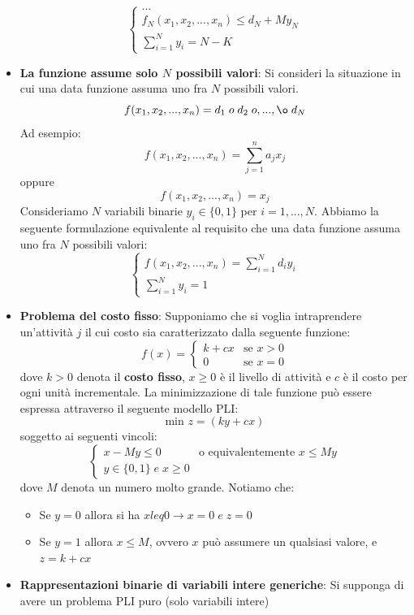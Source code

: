 \documentclass[12pt]{article}
\begin{document}
\begin{itemize}
$$\begin{cases}
        ... \\
        f_N(x_1, x_2, ..., x_n) \leq d_N + My_N \\
        \sum_{i=1}^{N} y_i = N - K
    \end{cases}$$
    \item \textbf{La funzione assume solo $N$ possibili valori}: Si consideri la situazione in cui una data funzione assuma uno fra $N$ possibili valori.
    $$f(x_1, x_2, ..., x_n) = d_1 \; o \; d_2 \; o ,..., \o \; d_N$$
    Ad esempio:
    $$f(x_1, x_2, ..., x_n) = \sum_{j=1}^{n} a_jx_j$$
    oppure
    $$f(x_1, x_2, ..., x_n) = x_j$$
    Consideriamo $N$ variabili binarie $y_i \in \{0,1\}$ per $i = 1,...,N$.
    Abbiamo la seguente formulazione equivalente al requisito che una data funzione assuma uno fra $N$ possibili valori:
    $$\begin{cases}
        f(x_1, x_2, ..., x_n) = \sum_{i=1}^{N} d_i y_i \\
        \sum_{i=1}^{N} y_i = 1
    \end{cases}$$
    \item \textbf{Problema del costo fisso}: Supponiamo che si voglia intraprendere un'attività $j$ il cui costo sia caratterizzato dalla seguente funzione:
    $$f(x) = \begin{cases}
        k + cx & \textrm{se } x > 0 \\
        0 & \textrm{se } x = 0
    \end{cases}$$
    dove $k > 0$ denota il \textbf{costo fisso}, $x \geq 0$ è il livello di attività e $c$ è il costo per ogni unità incrementale.
    La minimizzazione di tale funzione può essere espressa attraverso il seguente modello PLI:
    $$\textrm{min } z = (ky + cx)$$
    soggetto ai seguenti vincoli:
    $$\begin{cases}
        x - My \leq 0 & \textrm{o equivalentemente } x \leq My \\
        y \in \{0,1\} \; e \; x \geq 0
    \end{cases}$$
    dove $M$ denota un numero molto grande. Notiamo che:
    \begin{itemize}
        \item Se $y = 0$ allora si ha $x leq 0 \rightarrow x = 0 \; e \; z = 0$
        \item Se $y = 1$ allora $x \leq M$, ovvero $x$ può assumere un qualsiasi valore, e $z = k + cx$
    \end{itemize}
    \item \textbf{Rappresentazioni binarie di variabili intere generiche}: Si supponga di avere un problema PLI puro (solo variabili intere)

\end{itemize}
\end{document}
